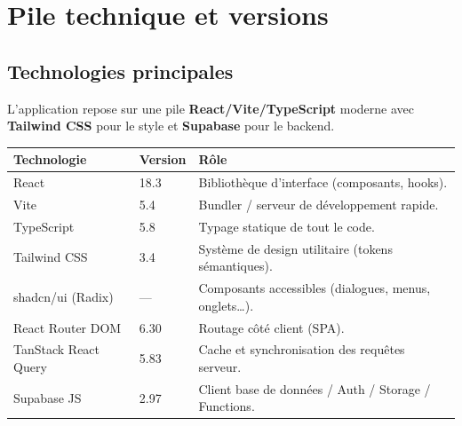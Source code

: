 \chapter{Pile technique et versions}

\section{Technologies principales}
L'application repose sur une pile \textbf{React/Vite/TypeScript} moderne avec
\textbf{Tailwind CSS} pour le style et \textbf{Supabase} pour le backend.

\begin{longtable}{p{4.2cm}p{2.2cm}p{8cm}}
\toprule
\textbf{Technologie} & \textbf{Version} & \textbf{Rôle} \\
\midrule
\endhead
React & 18.3 & Bibliothèque d'interface (composants, hooks). \\
Vite & 5.4 & Bundler / serveur de développement rapide. \\
TypeScript & 5.8 & Typage statique de tout le code. \\
Tailwind CSS & 3.4 & Système de design utilitaire (tokens sémantiques). \\
shadcn/ui (Radix) & --- & Composants accessibles (dialogues, menus, onglets\dots). \\
React Router DOM & 6.30 & Routage côté client (SPA). \\
TanStack React Query & 5.83 & Cache et synchronisation des requêtes serveur. \\
Supabase JS & 2.97 & Client base de données / Auth / Storage / Functions. \\
\bottomrule
\end{longtable}

